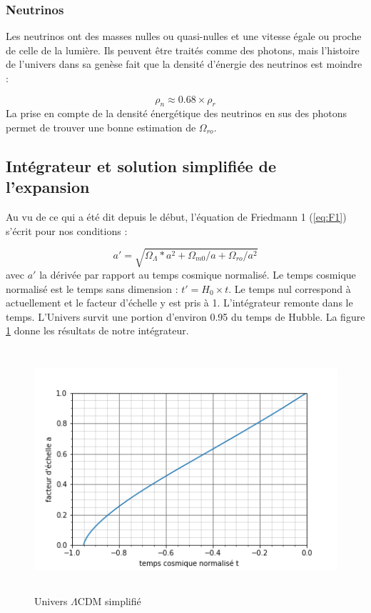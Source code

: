 \documentclass[10pt, a4paper]{report}
\numberwithin{equation}{subsection}
\begin{document}
\subsubsection{Neutrinos}
Les neutrinos ont des masses nulles ou quasi-nulles et une vitesse égale ou proche de celle de la lumière. Ils peuvent être traités comme des photons, mais l'histoire de l'univers dans sa genèse fait que la densité d'énergie des neutrinos est moindre :

\begin{equation} \label{eq:EDN}
\boxed{\rho_n \approx 0.68 \times \rho_r}
\end{equation}
La prise en compte de la densité énergétique des neutrinos en sus des photons permet de trouver une bonne estimation de $\Omega_{ro}$.
\subsection{Intégrateur et solution simplifiée de l'expansion}
Au vu de ce qui a été dit depuis le début, l'équation de Friedmann 1 (\ref{eq:F1}) s'écrit pour nos conditions :

\begin{equation} \label{eq:ELCDM}
\boxed{a' = \sqrt{\Omega_{\Lambda}*a^2+\Omega_{m0}/a+\Omega_{ro}/a^2}}
\end{equation}
avec $a'$ la dérivée par rapport au temps cosmique normalisé. Le temps cosmique normalisé est le temps sans dimension : $t' = H_0 \times t$.  Le temps nul correspond à actuellement et le facteur d'échelle y est pris à 1. L'intégrateur remonte dans le temps. L'Univers survit une portion d'environ 0.95 du temps de Hubble. La figure \ref{fig:ULCDM} donne les résultats de notre intégrateur.

\begin{figure}[]
\centering
\includegraphics[width=12.0cm,height=9cm]{LCDMf.png}
\caption{Univers $\Lambda$CDM simplifié}
\label{fig:ULCDM}
\end{figure}
 
\end{document}
